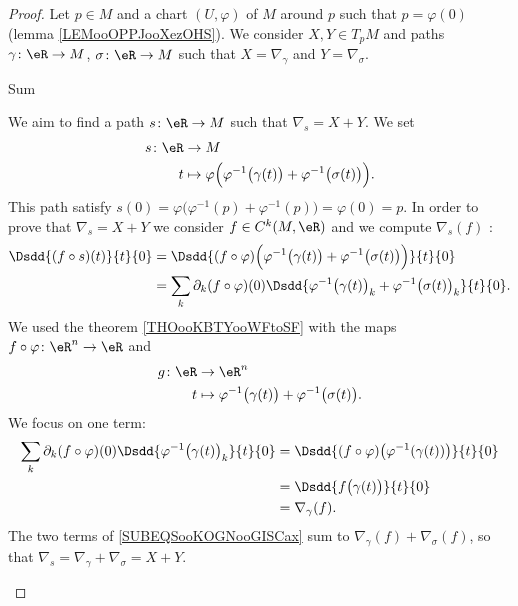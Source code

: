 \begin{proof}
    Let \( p\in M\) and a chart \( (U,\varphi)\) of \( M\) around \( p\) such that \( p=\varphi(0)\) (lemma \ref{LEMooOPPJooXezOHS}). We consider \( X,Y\in T_pM\) and paths \( \gamma\colon \eR\to M\), \( \sigma\colon \eR\to M\) such that \( X=\nabla_{\gamma}\) and \( Y=\nabla_{\sigma}\).

    \begin{subproof}
    \item[Sum]
        

    We aim to find a path \( s\colon \eR\to M\) such that \( \nabla_s=X+Y\). We set
    \begin{equation}        \label{EQooYNAOooKkKmxo}
        \begin{aligned}
            s\colon \eR&\to M \\
            t&\mapsto \varphi\Big( \varphi^{-1}\big( \gamma(t) \big)+\varphi^{-1}\big( \sigma(t) \big) \Big). 
        \end{aligned}
    \end{equation}
    This path satisfy \( s(0)=\varphi\Big( \varphi^{-1}(p)+\varphi^{-1}(p) \Big)=\varphi(0)=p\). In order to prove that \( \nabla_s=X+Y\) we consider \( f\in C^k(M,\eR)\) and we compute \( \nabla_s(f)\) :
    \begin{subequations}        \label{SUBEQSooKOGNooGISCax}
        \begin{align}
            \Dsdd{ (f\circ s)(t) }{t}{0}&=\Dsdd{ (f\circ\varphi)\Big( \varphi^{-1}\big( \gamma(t) \big)+\varphi^{-1}\big( \sigma(t) \big) \Big) }{t}{0}\\
            &=\sum_k\partial_k(f\circ \varphi)(0)\Dsdd{ \varphi^{-1}\big( \gamma(t) \big)_k+\varphi^{-1}\big( \sigma(t) \big)_k }{t}{0}.
        \end{align}
    \end{subequations}
    We used the theorem \ref{THOooKBTYooWFtoSF} with the maps \( f\circ \varphi\colon \eR^n\to \eR\) and
    \begin{equation}
        \begin{aligned}
            g\colon \eR&\to \eR^n \\
            t&\mapsto \varphi^{-1}\big( \gamma(t) \big)+\varphi^{-1}\big( \sigma(t) \big). 
        \end{aligned}
    \end{equation}
    We focus on one term:
    \begin{subequations}
        \begin{align}
            \sum_k\partial_k(f\circ \varphi)(0)\Dsdd{ \varphi^{-1}\big( \gamma(t) \big)_k }{t}{0} &=\Dsdd{ (f\circ\varphi)\big( \varphi^{-1}(\gamma(t)) \big) }{t}{0}\\
            &=\Dsdd{ f\big( \gamma(t) \big) }{t}{0}\\
            &=\nabla_{\gamma}(f).
        \end{align}
    \end{subequations}
    The two terms of \eqref{SUBEQSooKOGNooGISCax} sum to \( \nabla_{\gamma}(f)+\nabla_{\sigma}(f)\), so that \( \nabla_s=\nabla_{\gamma}+\nabla_{\sigma}=X+Y\).


\end{subproof}
\end{proof}
